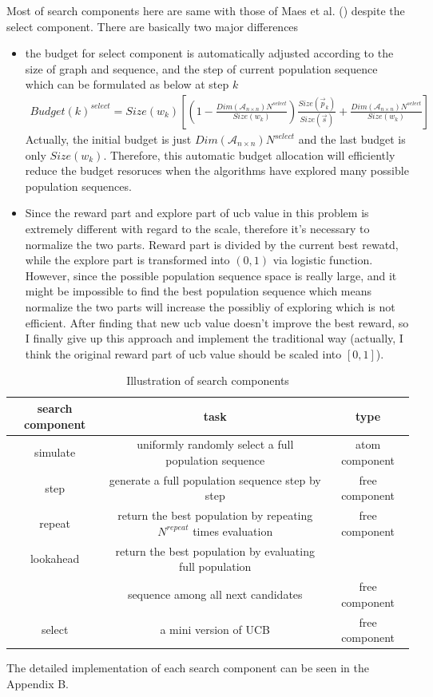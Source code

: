 \documentclass{article}
\begin{document}
Most of search components here are same with those of Maes et al. (\cite{maes2012monte}) despite the select component. There are basically two major differences
\begin{itemize}
  \item the budget for select component is automatically adjusted according to the size of graph and sequence, and the step of current population sequence which can be formulated as below at step $k$
    \begin{align}
      Budget(k)^{select} = Size(w_{k}) [(1 - \frac{Dim(\mathcal{A}_{n \times n}) N^{select}}{Size(w_{k})}) \frac{Size(\vec p_{k})}{Size(\vec s)} + \frac{Dim(\mathcal{A}_{n \times n}) N^{select}}{Size(w_{k})}]
    \end{align}
    Actually, the initial budget is just $Dim(\mathcal{A}_{n \times n}) N^{select}$ and the last budget is only $Size(w_{k})$. Therefore, this automatic budget allocation will efficiently reduce the budget resoruces when the algorithms have explored many possible population sequences.
  \item Since the reward part and explore part of ucb value in this problem is extremely different with regard to the scale, therefore it's necessary to normalize the two parts. Reward part is divided by the current best rewatd, while the explore part is transformed into $(0,1)$ via logistic function. However, since the possible population sequence space is really large, and it might be impossible to find the best population sequence which means normalize the two parts will increase the possibliy of exploring which is not efficient. After finding that new ucb value doesn't improve the best reward, so I finally give up this approach and implement the traditional way (actually, I think the original reward part of ucb value should be scaled into $[0,1]$).
\end{itemize}


\begin{table}[htbp]
  \centering
  \caption{Illustration of search components}
    \begin{tabular}{ccc}
    \toprule
    search component &  task & type\\
    \midrule
    simulate & uniformly randomly select a full population sequence & atom component\\
    step & generate a full population sequence step by step & free component\\
    repeat & return the best population by repeating $N^{repeat}$ times evaluation & free component\\
    lookahead & return the best population by evaluating full population &  \\
    & sequence among all next candidates & free component\\
    select & a mini version of UCB & free component\\
    \bottomrule
    \end{tabular}%
  \label{tab:search_components}%
\end{table}%
The detailed implementation of each search component can be seen in the Appendix B.
\end{document}
